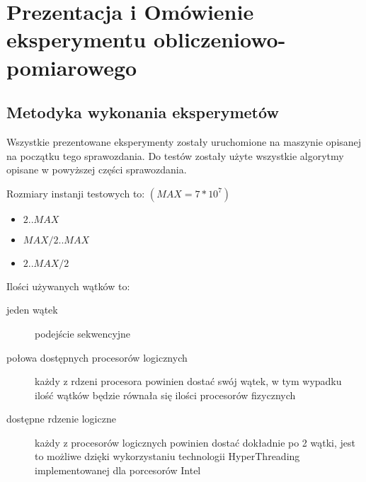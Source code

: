 \documentclass{article}
\begin{document}
    \section{Prezentacja i Omówienie eksperymentu obliczeniowo-pomiarowego}
        \subsection{Metodyka wykonania eksperymetów}
                Wszystkie prezentowane eksperymenty zostały uruchomione na maszynie opisanej na początku tego sprawozdania. Do testów zostały użyte wszystkie algorytmy opisane w powyższej części sprawozdania.
                
                \noindent
                Rozmiary instanji testowych to: $(MAX = 7 * 10^7)$
                \begin{itemize}
                    \item $2 .. MAX$
                    \item $MAX / 2 .. MAX$
                    \item $2 .. MAX / 2$
                \end{itemize}
                
                \noindent
                Ilości używanych wątków to:
                \begin{description}
                    \item[jeden wątek] podejście sekwencyjne
                    \item[połowa dostępnych procesorów logicznych] każdy z rdzeni procesora powinien dostać swój wątek, w tym wypadku ilość wątków będzie równała się ilości procesorów fizycznych
                    \item[dostępne rdzenie logiczne] każdy z procesorów logicznych powinien dostać dokładnie po 2 wątki, jest to możliwe dzięki wykorzystaniu technologii HyperThreading implementowanej dla porcesorów Intel
                \end{description}
        
\end{document}
